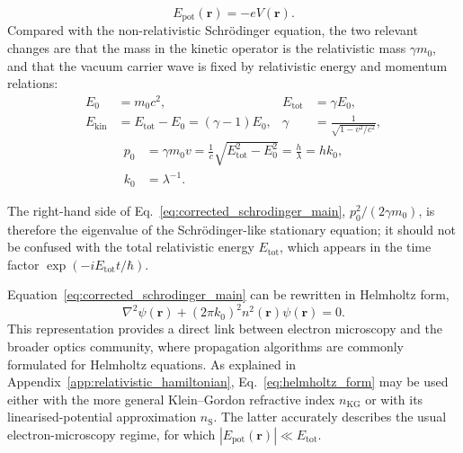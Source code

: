 \documentclass[preprint,12pt,number]{elsarticle}
\begin{document}
\begin{equation}
E_{\mathrm{pot}}(\mathbf r)
=
-eV(\mathbf r).
\label{eq:potential_energy_main}
\end{equation}
Compared with the non-relativistic Schr\"odinger equation, the two relevant
changes are that the mass in the kinetic operator is the relativistic mass
$\gamma m_0$, and that the vacuum carrier wave is fixed by relativistic energy
and momentum relations:
\begin{equation}
\begin{aligned}
E_0 &= m_0c^2, &
E_{\mathrm{tot}} &= \gamma E_0,\\
E_{\mathrm{kin}} &= E_{\mathrm{tot}}-E_0=(\gamma-1)E_0, &
\gamma &= \frac{1}{\sqrt{1-v^2/c^2}},
\end{aligned}
\label{eq:relativistic_energy_relations}
\end{equation}
\begin{equation}
\begin{aligned}
p_0
&=
\gamma m_0v
=
\frac{1}{c}\sqrt{E_{\mathrm{tot}}^2-E_0^2}
=
\frac{h}{\lambda}
=
hk_0,\\
k_0
&=
\lambda^{-1}.
\end{aligned}
\label{eq:relativistic_momentum_relations}
\end{equation}


The right-hand side of Eq.~\eqref{eq:corrected_schrodinger_main},
$p_0^2/(2\gamma m_0)$, is therefore the eigenvalue of the
Schr\"odinger-like stationary equation; it should not be confused with the
total relativistic energy $E_{\mathrm{tot}}$, which appears in the time factor
$\exp(-iE_{\mathrm{tot}}t/\hbar)$.


Equation~\eqref{eq:corrected_schrodinger_main} can be rewritten in Helmholtz
form,
\begin{equation}
\nabla^2\psi(\mathbf r)
+
(2\pi k_0)^2n^2(\mathbf r)\psi(\mathbf r)
=0.
\label{eq:helmholtz_form}
\end{equation}
This representation provides a direct link between electron microscopy and
the broader optics community, where propagation algorithms are commonly
formulated for Helmholtz equations. As explained in
Appendix~\ref{app:relativistic_hamiltonian}, Eq.~\eqref{eq:helmholtz_form} may
be used either with the more general Klein--Gordon refractive index
$n_{\mathrm{KG}}$ or with its linearised-potential approximation
$n_{\mathrm S}$. The latter accurately describes the usual electron-microscopy
regime, for which
$|E_{\mathrm{pot}}(\mathbf r)|\ll E_{\mathrm{tot}}$.
\end{document}
